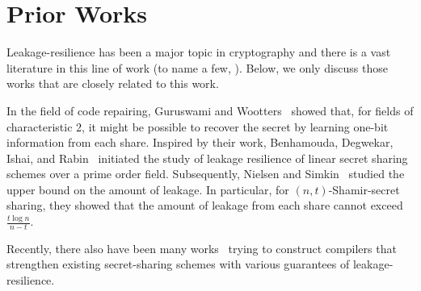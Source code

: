\section {Prior Works}
\label{sec:prior} 

Leakage-resilience has been a major topic in cryptography and there is a vast  literature in this line of work (to name a few,  \cite{Kocher96,GolOst96,KocJafJun99,IshSahWag03,MicRey04,Dziembowski06,DodKalLov09}). Below, we only discuss those works that are closely related to this work.

In the field of code repairing, Guruswami and Wootters~\cite{GurWoo16} showed that, for fields of characteristic 2, it might be possible to recover the secret by learning one-bit information from each share. 
Inspired by their work, Benhamouda, Degwekar, Ishai, and Rabin~\cite{C:BDIR18} initiated the study of leakage resilience of linear secret sharing schemes over a prime order field. 
Subsequently, Nielsen and Simkin~\cite{NS20} studied the upper bound on the amount of leakage. In particular, for $(n,t)$-Shamir-secret sharing, they showed that the amount of leakage from each share cannot exceed $\frac{t\log n}{n-t}$. 

Recently, there also have been many works~\cite{GoyKum18,BadSri19,KumMekSah19,SriVas19,ADNOPRS19} trying to construct compilers that strengthen existing secret-sharing schemes with various guarantees of leakage-resilience.


